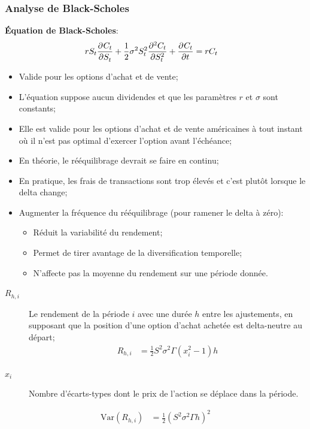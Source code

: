 \documentclass[10pt, french]{article}
\begin{document}
\begin{multicols*}{2}
\subsubsection{Analyse de Black-Scholes}
\textbf{Équation de Black-Scholes}:
\begin{align*}
	r S_{t} \deriv{S_{t}}{C_{t}} + \frac{1}{2}\sigma^{2}S_{t}^{2}\deriv[2]{S_{t}}{C_{t}} + \deriv{t}{C_{t}}	
	&=	r C_{t}	
\end{align*}
\begin{itemize}
	\item	Valide pour les options d'achat et de vente;
	\item	L'équation suppose aucun dividendes et que les paramètres $r$ et $\sigma$ sont constants;
	\item	Elle est valide pour les options d'achat et de vente américaines à tout instant où il n'est pas optimal d'exercer l'option avant l'échéance;
	\item	En théorie, le rééquilibrage devrait se faire en continu;
	\item	En pratique, les frais de transactions sont trop élevés et c'est plutôt lorsque le delta change;
	\item	Augmenter la fréquence du rééquilibrage (pour ramener le delta à zéro):
		\begin{itemize}
		\item	Réduit la variabilité du rendement;
		\item	Permet de tirer avantage de la diversification temporelle;
		\item	N'affecte pas la moyenne du rendement sur une période donnée.
		\end{itemize}
\end{itemize}

\begin{description}
	\item[$R_{h, i}$]	Le rendement de la période $i$ avec une durée $h$ entre les ajustements, en  supposant que la position d'une option d'achat achetée est delta-neutre au départ;
		\begin{align*}
		R_{h, i}	
		&=	\frac{1}{2} S^{2}\sigma^{2}\Gamma(x_{i}^{2} - 1)h
		\end{align*}
	\item[$x_{i}$]	Nombre d'écarts-types dont le prix de l'action se déplace dans la période.
\end{description}
\begin{align*}
	\text{Var}(R_{h, i})
	&=	\frac{1}{2}(S^{2}\sigma^{2}\Gamma h)^{2}
\end{align*}


\end{multicols*}
\end{document}
